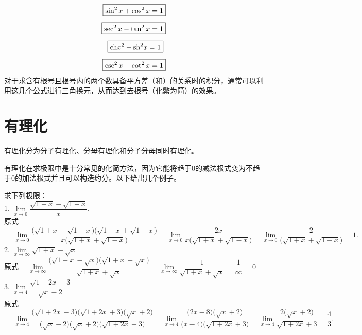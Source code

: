 \begin{tcolorbox}[title=补充：平方差（和）为1的重要公式]
	\begin{align}
		\boxed{\sin^2 x + \cos^2 x = 1} \\[0.5em]
		\boxed{\sec^2 x - \tan^2 x = 1} \\[0.5em]
		\boxed{\text{ch} x^2 - \text{sh}^2 x = 1}\,\, \\[0.5em]
		\boxed{\csc^2 x - \cot^2 x = 1}
	\end{align}
	\qquad 对于求含有根号且根号内的两个数具备平方差（和）的关系时的积分，通常可以利用这几个公式进行三角换元，从而达到去根号（化繁为简）的效果。
\end{tcolorbox}
\vspace*{0.5em}

\section{有理化}
有理化分为分子有理化、分母有理化和分子分母同时有理化。

有理化在求极限中是十分常见的化简方法，因为它能将趋于0的减法根式变为不趋于0的加法根式并且可以构造约分。以下给出几个例子。

\examples 求下列极限：\\[1em]
1. $\displaystyle \lim\limits_{x \to 0} \dfrac{\sqrt{1+x} - \sqrt{1-x}}{x}$.\\[1em]
\solve 原式$\displaystyle = \lim \limits_{x \to 0} \dfrac{\big(\sqrt{1+x} - \sqrt{1-x} \big)\big(\sqrt{1+x} + \sqrt{1-x}\big)}{x\big( \sqrt{1+x} + \sqrt{1-x} \big)} = \lim \limits_{x \to 0} \dfrac{2x}{x\big( \sqrt{1+x} + \sqrt{1-x} \big)} = \lim \limits_{x \to 0} \dfrac{2}{\big( \sqrt{1+x} + \sqrt{1-x} \big)} = 1.$\\[1em]
2. $\displaystyle \lim \limits_{x \to \infty} \sqrt{1+x} - \sqrt{x}$\\[1em]
\solve 原式$\displaystyle =\lim \limits_{x \to \infty} \dfrac{\big(\sqrt{1+x} - \sqrt{x}\big) \big( \sqrt{1+x} + \sqrt{x} \big)}{\sqrt{1+x} + \sqrt{x}} = \lim \limits_{x \to \infty} \dfrac{1}{\sqrt{1+x}+\sqrt{x}} = \dfrac{1}{\infty} = 0$\\[1em]
3. $\displaystyle \lim \limits_{x \to 4} \dfrac{\sqrt{1+2x} - 3}{\sqrt{x} - 2}$\\[1em]
\solve 原式$\displaystyle=\lim \limits_{x \to 4} \dfrac{\big( \sqrt{1+2x} - 3 \big) \big(\sqrt{1+2x} + 3 \big) \big(\sqrt{x} + 2 \big)}{\big(\sqrt{x} - 2\big) \big(\sqrt{x} + 2 \big) \big(\sqrt{1+2x} + 3 \big)} = \lim \limits_{x \to 4} \dfrac{\big(2x-8\big) \big(\sqrt{x} + 2 \big)}{\big( x - 4 \big) \big( \sqrt{1+2x} + 3 \big)} = \lim \limits_{x \to 4} \dfrac{2\big( \sqrt{x} + 2 \big)}{\sqrt{1+2x}+3} =\dfrac{4}{3}.$

